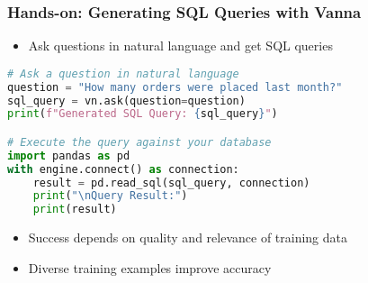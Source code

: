 \begin{frame}[fragile]\frametitle{Hands-on: Generating SQL Queries with Vanna}
      \begin{itemize}
        \item Ask questions in natural language and get SQL queries
      \end{itemize}
      
\begin{lstlisting}[language=python]
# Ask a question in natural language
question = "How many orders were placed last month?"
sql_query = vn.ask(question=question)
print(f"Generated SQL Query: {sql_query}")

# Execute the query against your database
import pandas as pd
with engine.connect() as connection:
    result = pd.read_sql(sql_query, connection)
    print("\nQuery Result:")
    print(result)
\end{lstlisting}

      \begin{itemize}
        \item Success depends on quality and relevance of training data
        \item Diverse training examples improve accuracy
      \end{itemize}
\end{frame}
